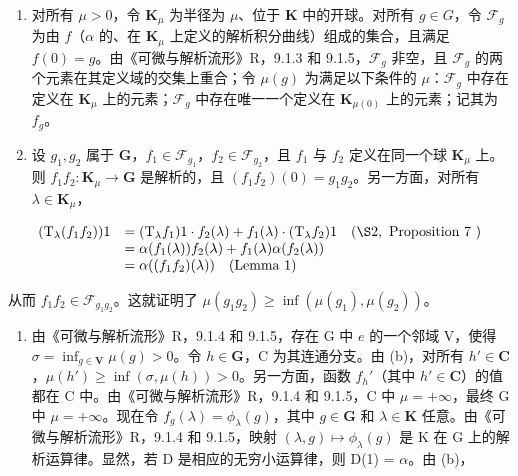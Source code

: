 \begin{enumerate}
\def\labelenumi{(\alph{enumi})}
\item
  对所有 \(\mu > 0\)，令 \(\mathbf{K}_{\mu}\) 为半径为 \(\mu\)、位于 \(\mathbf{K}\) 中的开球。对所有 \(g \in G\)，令 \(\mathcal{F}_g\) 为由 \(f\)（\(\alpha\) 的、在 \(\mathbf{K}_{\mu}\) 上定义的解析积分曲线）组成的集合，且满足 \(f(0) = g\)。由《可微与解析流形》R，9.1.3 和 9.1.5，\(\mathcal{F}_g\) 非空，且 \(\mathcal{F}_g\) 的两个元素在其定义域的交集上重合；令 \(\mu(g)\) 为满足以下条件的 \(\mu\)：\(\mathcal{F}_g\) 中存在定义在 \(\mathbf{K}_{\mu}\) 上的元素；\(\mathcal{F}_g\) 中存在唯一一个定义在 \(\mathbf{K}_{\mu(0)}\) 上的元素；记其为 \(f_g\)。
\item
  设 \(g_1, g_2\) 属于 \(\mathbf{G}\)，\(f_1 \in \mathcal{F}_{g_1}\)，\(f_2 \in \mathcal{F}_{g_2}\)，且 \(f_1\) 与 \(f_2\) 定义在同一个球 \(\mathbf{K}_\mu\) 上。则 \(f_1f_2: \mathbf{K}_\mu \to \mathbf{G}\) 是解析的，且 \((f_1f_2)(0) = g_1g_2\)。另一方面，对所有 \(\lambda \in \mathbf{K}_\mu\)，
\end{enumerate}

\[
\begin{array}{r l} (\mathrm{T} _ {\lambda} (f _ {1} f _ {2})) 1 & = (\mathrm{T} _ {\lambda} f _ {1}) 1 \cdot f _ {2} (\lambda) + f _ {1} (\lambda) \cdot (\mathrm{T} _ {\lambda} f _ {2}) 1 \quad (\S 2, \text { Proposition   7 }) \\ & = \alpha (f _ {1} (\lambda)) f _ {2} (\lambda) + f _ {1} (\lambda) \alpha (f _ {2} (\lambda)) \\ & = \alpha ((f _ {1} f _ {2}) (\lambda)) \quad \text {(Lemma   1)} \end{array}
\]

从而 \(f_{1}f_{2}\in \mathcal{F}_{g_{1}g_{2}}\)。这就证明了 \(\mu (g_1g_2)\geqslant \inf (\mu (g_1),\mu (g_2))\)。

\begin{enumerate}
\def\labelenumi{(\alph{enumi})}
\setcounter{enumi}{2}
\tightlist
\item
  由《可微与解析流形》R，9.1.4 和 9.1.5，存在 G 中 \(e\) 的一个邻域 V，使得 \(\sigma = \inf_{g \in \mathbf{V}} \mu(g) > 0\)。令 \(h \in \mathbf{G}\)，C 为其连通分支。由 (b)，对所有 \(h' \in \mathbf{C}\)，\(\mu(h') \geqslant \inf(\sigma, \mu(h)) > 0\)。另一方面，函数 \(f_h'\)（其中 \(h' \in \mathbf{C}\)）的值都在 C 中。由《可微与解析流形》R，9.1.4 和 9.1.5，C 中 \(\mu = +\infty\)，最终 G 中 \(\mu = +\infty\)。现在令 \(f_g(\lambda) = \phi_{\lambda}(g)\)，其中 \(g \in \mathbf{G}\) 和 \(\lambda \in \mathbf{K}\) 任意。由《可微与解析流形》R，9.1.4 和 9.1.5，映射 \((\lambda, g) \mapsto \phi_{\lambda}(g)\) 是 K 在 G 上的解析运算律。显然，若 D 是相应的无穷小运算律，则 D(1) = \(\alpha\)。由 (b)，
\end{enumerate}

